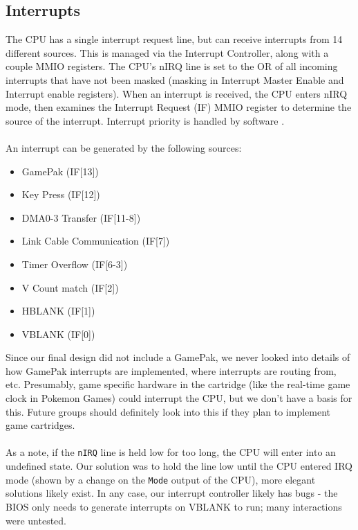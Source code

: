 \documentclass[11pt,a4paper]{article}
\begin{document}
	\subsection{Interrupts}
	The CPU has a single interrupt request line, but can receive interrupts from 14 different sources. This is managed via the Interrupt Controller, along with a couple MMIO registers. The CPU's nIRQ line is set to the OR of all incoming interrupts that have not been masked (masking in Interrupt Master Enable and Interrupt enable registers). When an interrupt is received, the CPU enters nIRQ mode, then examines the Interrupt Request (IF) MMIO register to determine the source of the interrupt. Interrupt priority is handled by software \cite{GBAManual}.\\\\
	An interrupt can be generated by the following sources:
	\begin{multicols}{3}
	\begin{itemize}
		\item GamePak (IF[13])
		\item Key Press (IF[12])
		\item DMA{0-3} Transfer (IF[11-8])
		\item Link Cable Communication (IF[7])
		\item Timer Overflow (IF[6-3])
		\item V Count match (IF[2])
		\item HBLANK (IF[1])
		\item VBLANK (IF[0])
	\end{itemize} 
	\end{multicols}
	
	Since our final design did not include a GamePak, we never looked into details of how GamePak interrupts are implemented, where interrupts are routing from, etc. Presumably, game specific hardware in the cartridge (like the real-time game clock in Pokemon Games) could interrupt the CPU, but we don't have a basis for this. Future groups should definitely look into this if they plan to implement game cartridges.\\\\
	As a note, if the \texttt{nIRQ} line is held low for too long, the CPU will enter into an undefined state. Our solution was to hold the line low until the CPU entered IRQ mode (shown by a change on the \texttt{Mode} output of the CPU), more elegant solutions likely exist. In any case, our interrupt controller likely has bugs - the BIOS only needs to generate interrupts on VBLANK to run; many interactions were untested.
	
\end{document}
